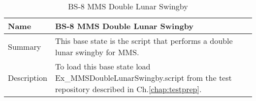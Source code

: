 \begin{table}[htbp!]
\centering
      \begin{tabular}{|p{1.05 in} |p{4.75 in} |}
      \hline
         \rowcolor[rgb]{0.8,0.8,0.8} Name & BS-8 MMS Double Lunar Swingby \\
         \hline
         Summary &
         This base state is the script that performs a double lunar swingby for MMS.
         \\ \hline
         Description &
          To load this base state load Ex\_MMSDoubleLunarSwingby.script from the test repository described in Ch.\ref{chap:testprep}.
         \\ \hline
\end{tabular}
      \label{Table: BS-8}
      \caption{BS-8 MMS Double Lunar Swingby }
\end{table}